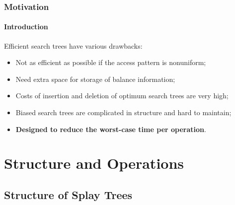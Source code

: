 \documentclass{beamer}
\theoremstyle{plain}
\begin{document}
    \begin{frame}
        \frametitle{Motivation}
        \framesubtitle{Introduction}
    
        Efficient search trees have various drawbacks\cite{10.1145/3828.3835}:
        \begin{itemize}
            \item Not as efficient as possible if the access pattern is nonuniform;
            \item Need extra space for storage of balance information;
            \item Costs of insertion and deletion of optimum search trees are very high;
            \item Biased search trees are complicated in structure and hard to maintain;
            \item \textbf{Designed to reduce the worst-case time per operation}.
        \end{itemize}
    
    \end{frame}

    \section{Structure and Operations}
    \subsection{Structure of Splay Trees}
\end{document}
